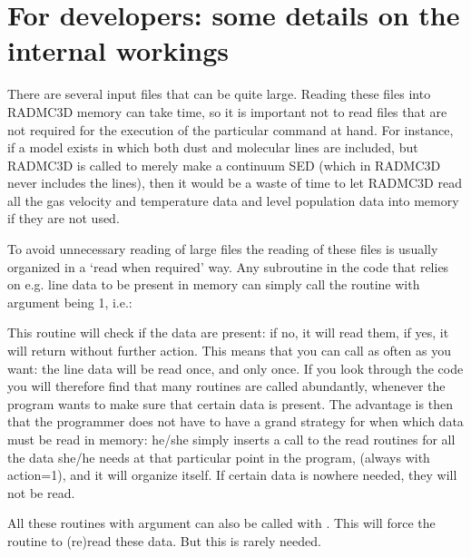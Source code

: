 \documentclass[letterpaper,10pt,english]{sphinxmanual}
\begin{document}
\section{For developers: some details on the internal workings}
\label{\detokenize{inputoutputfiles:for-developers-some-details-on-the-internal-workings}}
There are several input files that can be quite large. Reading these files
into RADMC\sphinxhyphen{}3D memory can take time, so it is important not to read files
that are not required for the execution of the particular command at
hand. For instance, if a model exists in which both dust and molecular
lines are included, but RADMC\sphinxhyphen{}3D is called to merely make a continuum
SED (which in RADMC\sphinxhyphen{}3D never includes the lines), then it would be a
waste of time to let RADMC\sphinxhyphen{}3D read all the gas velocity and temperature
data and level population data into memory if they are not used.

To avoid unnecessary reading of large files the reading of these files is
usually organized in a ‘read when required’ way. Any subroutine in the code
that relies on e.g. line data to be present in memory can simply call the
routine  with argument  being 1,
i.e.:

\begin{sphinxVerbatim}[commandchars=\\\{\}]
 
\end{sphinxVerbatim}

This routine will check if the data are present: if no, it will read them,
if yes, it will return without further action. This means that you can call
 as often as you want: the line data will be read
once, and only once. If you look through the code you will therefore find
that many  routines are called abundantly, whenever the
program wants to make sure that certain data is present. The advantage is
then that the programmer does not have to have a grand strategy for when
which data must be read in memory: he/she simply inserts a call to the read
routines for all the data she/he needs at that particular point in the
program, (always with action=1), and it will organize itself. If certain
data is nowhere needed, they will not be read.

All these  routines with argument  can also
be called with . This will force the routine to (re\sphinxhyphen{})read
these data. But this is rarely needed.
\end{document}
